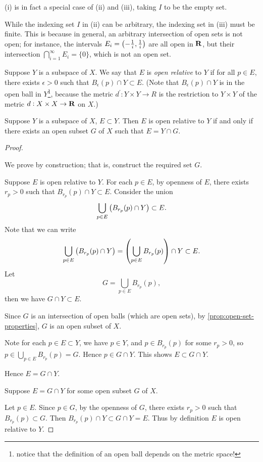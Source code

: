 \begin{remark}
(i) is in fact a special case of (ii) and (iii), taking $I$ to be the empty set.
\end{remark}

\begin{remark}
While the indexing set $I$ in (ii) can be arbitrary, the indexing set in (iii) must be finite. This is because in general, an arbitrary intersection of open sets is not open; for instance, the intervals $E_i=\left(-\frac{1}{i},\frac{1}{i}\right)$ are all open in $\mathbf R$, but their intersection $\bigcap_{i=1}^\infty E_i=\{0\}$, which is not an open set.
\end{remark}

Suppose $Y$ is a subspace of $X$. We say that $E$ is \emph{open relative} to $Y$ if for all $p\in E$, there exists $\epsilon>0$ such that $B_\epsilon(p)\cap Y\subset E$. (Note that $B_\epsilon(p)\cap Y$ is in the open ball in $Y$\footnote{notice that the definition of an open ball depends on the metric space!}, because the metric $d^\prime:Y\times Y\to R$ is the restriction to $Y\times Y$ of the metric $d:X\times X\to\mathbf R$ on $X$.)

\begin{proposition}\label{prop:open-subspace-cap}
Suppose $Y$ is a subspace of $X$, $E\subset Y$. Then $E$ is open relative to $Y$ if and only if there exists an open subset $G$ of $X$ such that $E=Y\cap G$.
\end{proposition}

\begin{proof} \

\fbox{$\implies$} We prove by construction; that is, construct the required set $G$.

Suppose $E$ is open relative to $Y$. For each $p\in E$, by openness of $E$, there exists $r_p>0$ such that $B_{r_p}(p)\cap Y\subset E$.
Consider the union
\[\bigcup_{p\in E}\left(B_{r_p}(p)\cap Y\right)\subset E.\]
Note that we can write
\[\bigcup_{p\in E}\left(B_{r_p}(p)\cap Y\right)=\left(\bigcup_{p\in E}B_{r_p}(p)\right)\cap Y\subset E.\]
Let
\[G=\bigcup_{p\in E}B_{r_p}(p),\]
then we have $G\cap Y\subset E$. 

Since $G$ is an intersection of open balls (which are open sets), by \cref{prop:open-set-properties}, $G$ is an open subset of $X$.

Note for each $p\in E\subset Y$, we have $p\in Y$, and $p\in B_{r_p}(p)$ for some $r_p>0$, so $p\in\bigcup_{p\in E}B_{r_p}(p)=G$. Hence $p\in G\cap Y$. This shows $E\subset G\cap Y$.

Hence $E=G\cap Y$.

\fbox{$\impliedby$} Suppose $E=G\cap Y$ for some open subset $G$ of $X$. 

Let $p\in E$. Since $p\in G$, by the openness of $G$, there exists $r_p>0$ such that $B_{r_p}(p)\subset G$. Then $B_{r_p}(p)\cap Y\subset G\cap Y=E$. Thus by definition $E$ is open relative to $Y$.
\end{proof}

